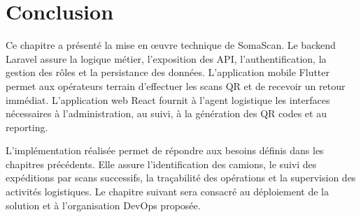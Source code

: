 \section{Conclusion}

Ce chapitre a présenté la mise en œuvre technique de SomaScan. Le backend Laravel assure la logique métier, l'exposition des API, l'authentification, la gestion des rôles et la persistance des données. L'application mobile Flutter permet aux opérateurs terrain d'effectuer les scans QR et de recevoir un retour immédiat. L'application web React fournit à l'agent logistique les interfaces nécessaires à l'administration, au suivi, à la génération des QR codes et au reporting.

L'implémentation réalisée permet de répondre aux besoins définis dans les chapitres précédents. Elle assure l'identification des camions, le suivi des expéditions par scans successifs, la traçabilité des opérations et la supervision des activités logistiques. Le chapitre suivant sera consacré au déploiement de la solution et à l'organisation DevOps proposée.
